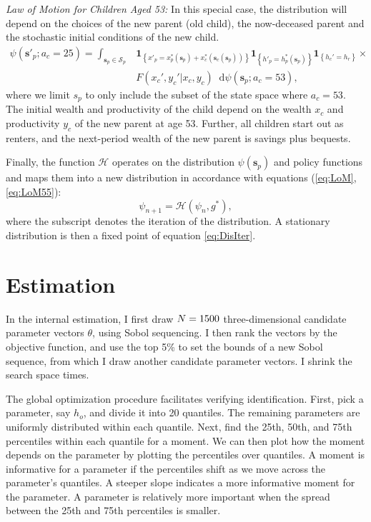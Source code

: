 \documentclass[12pt]{article}
\newcommand*\diff{\mathop{}\!\mathrm{d}}
\begin{document}
\textit{Law of Motion for Children Aged 53:} In this special case, the distribution will depend on the choices of the new parent (old child), the now-deceased parent and the stochastic initial conditions of the new child. 
\begin{equation}\label{eq:LoM55}
\begin{split}
\psi(\mathbf{s}'_p;a_c=25) = \int_{\mathbf{s}_p\in \mathcal{S}_p} & 
\mathbf{1}_{\left\{ x'_p = x^*_p(\mathbf s_p) + x^*_c(\mathbf s_c(\mathbf s_p)) \right\} }
\mathbf{1}_{\left\{ h'_p = h^*_p(\mathbf s_p) \right\} } 
\mathbf{1}_{\left\{ h_c' = h_r\right\}} \times \\
&F(x_c',y_c'|x_c,y_c) \diff \psi(\mathbf s_p;a_c=53),
\end{split}
\end{equation}
where we limit $s_p$ to only include the subset of the state space where $a_c=53$. The initial wealth and productivity of the child depend on the wealth $x_c$ and productivity $y_c$ of the new parent at age 53. Further, all children start out as renters, and the next-period wealth of the new parent is savings plus bequests.

Finally, the function $\mathcal{H}$ operates on the distribution $\psi(\mathbf{s}_p)$ and policy functions %
and maps them into a new distribution in accordance with equations (\ref{eq:LoM}, \ref{eq:LoM55}):
\begin{equation}\label{eq:DisIter}
\psi_{n+1} = \mathcal{H}(\psi_n,g^*),
\end{equation}
where the subscript denotes the iteration of the distribution. A stationary distribution is then a fixed point of equation \ref{eq:DisIter}.


\section{Estimation}\label{app:SMM}
In the internal estimation, I first draw $N=1500$ three-dimensional candidate parameter vectors $\theta$, using Sobol sequencing. I then rank the vectors by the objective function, and use the top 5\% to set the bounds of a new Sobol sequence, from which I draw another {\parNest} candidate parameter vectors. I shrink the search space {\parNshrinks} times. 

The global optimization procedure facilitates verifying identification. First, pick a parameter, say $h_o$, and divide it into 20 quantiles. The remaining parameters are uniformly distributed within each quantile. Next, find the 25th, 50th, and 75th percentiles within each quantile for a moment. We can then plot how the moment depends on the parameter by plotting the percentiles over quantiles. A moment is informative for a parameter if the percentiles shift as we move across the parameter's quantiles. A steeper slope indicates a more informative moment for the parameter. A parameter is relatively more important when the spread between the 25th and 75th percentiles is smaller. 
\end{document}
